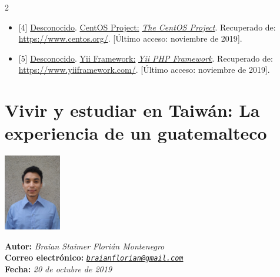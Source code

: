 \documentclass[12pt,spanish,Letterpaper,openany]{book}
\providecommand{\tightlist}{%
  \setlength{\itemsep}{0pt}\setlength{\parskip}{0pt}}
\newcommand{\tcolorboxcommand}{\begin{tcolorbox}[sharp corners=uphill, colback=newfondo, colframe=newfondo, arc=6mm, boxrule=0mm, boxsep=0mm]}
\newcommand{\spaceoneminus}{\vspace{-1mm}}
\begin{document}
\begin {multicols}{2}
\spaceoneminus

\begin{itemize}
\tightlist
\item
  {[}4{]} \href{https://www.centos.org/}{Desconocido}. \href{https://www.centos.org/}{CentOS Project:} \href{https://www.centos.org/}{\emph{The CentOS Project}}. Recuperado de: \url{https://www.centos.org/}. {[}Último acceso: noviembre de 2019{]}.
\end{itemize}

\spaceoneminus

\begin{itemize}
\tightlist
\item
  {[}5{]} \href{https://www.yiiframework.com/}{Desconocido}. \href{https://www.yiiframework.com/}{Yii Framework:} \href{https://www.yiiframework.com/}{\emph{Yii PHP Framework}}. Recuperado de: \url{https://www.yiiframework.com/}. {[}Último acceso: noviembre de 2019{]}.
\end{itemize}

\end {multicols}

\hypertarget{bflorian}{%
\chapter{Vivir y estudiar en Taiwán: La experiencia de un guatemalteco}\label{bflorian}}

\begin {flushleft}

\tcolorboxcommand

\begin{minipage}[c]{3cm}

\includegraphics[width=2.5cm,height=\textheight]{images/image01_bflorian1.jpg}

\end{minipage}\begin{minipage}[c]{12cm}

\textbf{Autor:} \emph{Braian Staimer Florián Montenegro}\\
\textbf{Correo electrónico:} \emph{\href{mailto:braianflorian@gmail.com}{\nolinkurl{braianflorian@gmail.com}}}\\
\textbf{Fecha:} \emph{20 de octubre de 2019}

\end{minipage}

\end {tcolorbox}

\end {flushleft}
\end{document}
